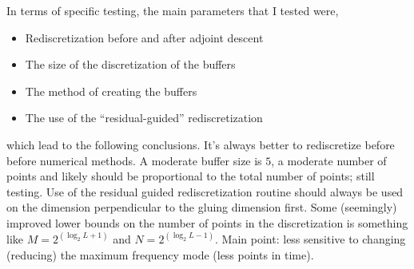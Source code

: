 In terms of specific testing, the main parameters that I tested were,
\begin{itemize}
\item Rediscretization before and after adjoint descent
\item The size of the discretization of the buffers
\item The method of creating the buffers
\item The use of the ``residual-guided'' rediscretization
\end{itemize}

which lead to the following conclusions. It's always better to rediscretize before
before numerical methods. A moderate buffer size is $5$, a moderate number of points and
likely should be proportional to the total number of points; still testing.
Use of the residual guided rediscretization routine should always
be used on the dimension perpendicular to the gluing dimension first.
Some (seemingly) improved lower bounds on the number of points in the discretization
is something like $M = 2^(\log_2 L + 1)$ and $N = 2^(\log_2 L -1)$.
Main point: less sensitive to changing (reducing) the maximum frequency
mode (less points in time). 